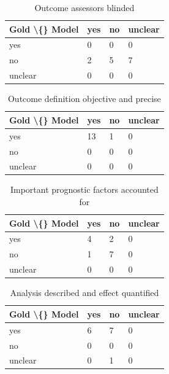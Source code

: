 \documentclass[11pt,a4paper]{article}
\begin{document}
\begin{table}[H]
\centering
\caption{Outcome assessors blinded}
\label{tab:supp_45}
\begin{tabular}{llll}
\toprule
Gold \textbackslash\{\} Model & yes & no & unclear \\
\midrule
yes & 0 & 0 & 0 \\
no & 2 & 5 & 7 \\
unclear & 0 & 0 & 0 \\
\bottomrule
\end{tabular}
\end{table}

\begin{table}[H]
\centering
\caption{Outcome definition objective and precise}
\label{tab:supp_46}
\begin{tabular}{llll}
\toprule
Gold \textbackslash\{\} Model & yes & no & unclear \\
\midrule
yes & 13 & 1 & 0 \\
no & 0 & 0 & 0 \\
unclear & 0 & 0 & 0 \\
\bottomrule
\end{tabular}
\end{table}

\begin{table}[H]
\centering
\caption{Important prognostic factors accounted for}
\label{tab:supp_47}
\begin{tabular}{llll}
\toprule
Gold \textbackslash\{\} Model & yes & no & unclear \\
\midrule
yes & 4 & 2 & 0 \\
no & 1 & 7 & 0 \\
unclear & 0 & 0 & 0 \\
\bottomrule
\end{tabular}
\end{table}

\begin{table}[H]
\centering
\caption{Analysis described and effect quantified}
\label{tab:supp_48}
\begin{tabular}{llll}
\toprule
Gold \textbackslash\{\} Model & yes & no & unclear \\
\midrule
yes & 6 & 7 & 0 \\
no & 0 & 0 & 0 \\
unclear & 0 & 1 & 0 \\
\bottomrule
\end{tabular}
\end{table}
\end{document}
